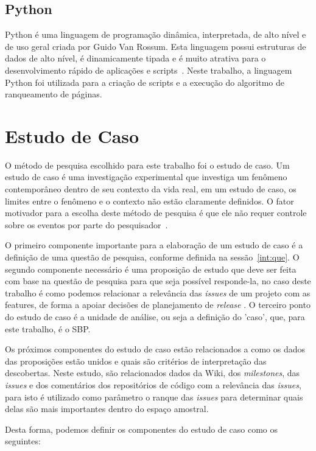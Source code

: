 \subsection{Python}
\label{met:tec:python}
Python é uma linguagem de programação dinâmica, interpretada, de alto nível e de  uso geral criada por Guido Van Rossum. Esta linguagem possui estruturas de dados de alto nível, é dinamicamente tipada e é muito atrativa para o desenvolvimento rápido de aplicações e scripts~\cite{python}. Neste trabalho, a linguagem Python foi utilizada para a criação de scripts e a execução do algoritmo de ranqueamento de páginas.

\section{Estudo de Caso}
\label{met:est}
O método de pesquisa escolhido para este trabalho foi o estudo de caso. Um estudo de caso é uma investigação experimental que investiga um fenômeno contemporâneo dentro de seu contexto da vida real, em um estudo de caso, os limites entre o fenômeno e o contexto não estão claramente definidos. O fator motivador para a escolha deste método de pesquisa é que ele não requer controle sobre os eventos por parte do pesquisador~\cite{yin}.

O primeiro componente importante para a elaboração de um estudo de caso é a definição de uma questão de pesquisa, conforme definida na sessão~\ref{int:que}. O segundo componente necessário é uma proposição de estudo que deve ser feita com base na questão de pesquisa para que seja possível responde-la, no caso deste trabalho é como podemos relacionar a relevância das \textit{issues} de um projeto com as features, de forma a apoiar decisões de planejamento de \textit{release} . O terceiro ponto do estudo de caso é a unidade de análise, ou seja a definição do 'caso', que, para este trabalho, é o SBP.

Os próximos componentes do estudo de caso estão relacionados a como os dados das proposições estão unidos e quais são critérios de interpretação das descobertas. Neste estudo, são relacionados dados da Wiki, dos \textit{milestones}, das \textit{issues} e dos comentários dos repositórios de código com a relevância das \textit{issues}, para isto é utilizado como parâmetro o ranque das \textit{issues} para determinar quais delas 
são mais importantes dentro do espaço amostral.

Desta forma, podemos definir os componentes do estudo de caso como os seguintes:

